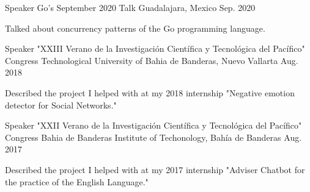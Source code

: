 

\begin{cventries}

  \cventry
    {Speaker} %
    {Go's September 2020 Talk} %
    {Guadalajara, Mexico} %
    {Sep. 2020} %
    {
      \begin{cvitems} %
        \item {Talked about concurrency patterns of the Go programming language.}
      \end{cvitems}
    }

  \cventry
    {Speaker} %
    {"XXIII Verano de la Investigación Científica y Tecnológica del Pacífico" Congress} %
    {Technological University of Bahia de Banderas, Nuevo Vallarta} %
    {Aug. 2018} %
    {
      \begin{cvitems} %
        \item {Described the project I helped with at my 2018 internship "Negative emotion detector for Social Networks."}
      \end{cvitems}
    }

  \cventry
    {Speaker} %
    {"XXII Verano de la Investigación Científica y Tecnológica del Pacífico" Congress} %
    {Bahia de Banderas Institute of Techonology, Bahía de Banderas} %
    {Aug. 2017} %
    {
      \begin{cvitems} %
        \item {Described the project I helped with at my 2017 internship "Adviser Chatbot for the practice of the English Language."}
      \end{cvitems}
    }

\end{cventries}
